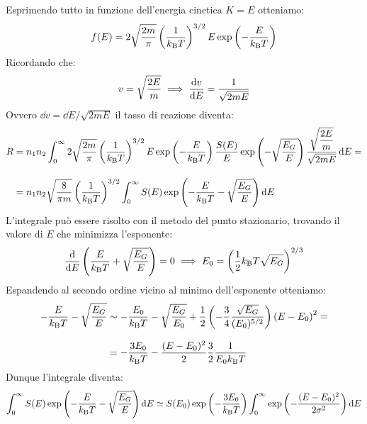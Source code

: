 Esprimendo tutto in funzione dell'energia cinetica $K = E$ otteniamo:
\begin{equation}
    f(E) = 2 \sqrt{\dfrac{2m}{\pi}} \left(\dfrac{1}{k_{\text{B}} T}\right)^{3/2} E \exp\left(-\dfrac{E}{k_{\text{B}} T}\right)
\end{equation}
Ricordando che:
\begin{equation}
    v = \sqrt{\dfrac{2E}{m}} \implies \dv{v}{E} = \dfrac{1}{\sqrt{2 m E}}
\end{equation}
Ovvero $\dd{v} = \dd{E} / \sqrt{2 m E}$ il tasso di reazione diventa:
\begin{equation}
    \begin{split}
        R &= n_1 n_2 \int_0^{\infty}2 \sqrt{\dfrac{2m}{\pi}} \left(\dfrac{1}{k_{\text{B}} T}\right)^{3/2} E \exp\left(-\dfrac{E}{k_{\text{B}} T}\right) \dfrac{S(E)}{E} \exp\left(-\sqrt{\dfrac{E_G}{E}}\right) \dfrac{\sqrt{\dfrac{2E}{m}}}{\sqrt{2 m E}}\dd{E} =\\[8pt]
        &= n_1 n_2 \sqrt{\dfrac{8}{\pi m}} \left(\dfrac{1}{k_{\text{B}} T}\right)^{3/2} \int_0^{\infty} S(E) \exp\left(-\dfrac{E}{k_{\text{B}} T} - \sqrt{\dfrac{E_G}{E}}\right) \dd{E}
    \end{split}
\end{equation}
L'integrale può essere risolto con il metodo del punto stazionario, trovando il valore di $E$ che minimizza l'esponente:
\begin{equation}
    \dv{}{E} \brackets{\dfrac{E}{k_{\text{B}} T} + \sqrt{\dfrac{E_G}{E}}} = 0 \implies E_0 = \brackets{\dfrac{1}{2} k_{\text{B}} T \sqrt{E_G}}^{2/3}
\end{equation}
Espandendo al secondo ordine vicino al minimo dell'esponente otteniamo:
\begin{equation}
    \begin{split}
        -\dfrac{E}{k_{\text{B}} T} - \sqrt{\dfrac{E_G}{E}} &\sim -\dfrac{E_0}{k_{\text{B}} T} - \sqrt{\dfrac{E_G}{E_0}} + \dfrac{1}{2}\left(-\dfrac{3}{4}\dfrac{\sqrt{E_G}}{(E_0)^{5/2}}\right)\left(E-E_0\right)^2 = \\[8pt]
        &= -\dfrac{3E_0}{k_{\text{B}} T} - \dfrac{(E - E_0)^2}{2} \dfrac{3}{2} \dfrac{1}{E_0 k_{\text{B}} T}
    \end{split}
\end{equation}
Dunque l'integrale diventa:
\begin{equation}
    \int_0^{\infty} S(E) \exp\left(-\dfrac{E}{k_{\text{B}} T} - \sqrt{\dfrac{E_G}{E}}\right) \dd{E} \simeq S(E_0) \exp\left(-\dfrac{3E_0}{k_{\text{B}} T}\right) \int_0^{\infty} \exp\left(-\dfrac{(E - E_0)^2}{2 \sigma^2}\right) \dd{E}
\end{equation}
